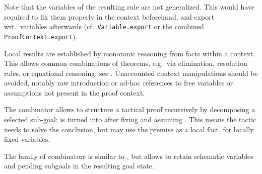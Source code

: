 \begin{isabellebody}
{}%
\endisatagML
{\isafoldML}%
%
\isadelimML
%
\endisadelimML
%
\begin{isamarkuptext}%
Note that the variables of the resulting rule are not
  generalized.  This would have required to fix them properly in the
  context beforehand, and export wrt.\ variables afterwards (cf.\ \verb|Variable.export| or the combined \verb|ProofContext.export|).%
\end{isamarkuptext}%
\isamarkuptrue%
%
\isamarkuptrue%
%
\begin{isamarkuptext}%
Local results are established by monotonic reasoning from facts
  within a context.  This allows common combinations of theorems,
  e.g.\ via  elimination, resolution rules, or equational
  reasoning, see .  Unaccounted context manipulations
  should be avoided, notably raw  introduction or ad-hoc
  references to free variables or assumptions not present in the proof
  context.

  \medskip The  combinator allows to structure a
  tactical proof recursively by decomposing a selected sub-goal:
   is turned into 
  after fixing  and assuming .  This means
  the tactic needs to solve the conclusion, but may use the premise as
  a local fact, for locally fixed variables.

  The family of  combinators is similar to , but allows to retain schematic variables and pending
  subgoals in the resulting goal state.


\end{isamarkuptext}
\end{isabellebody}

